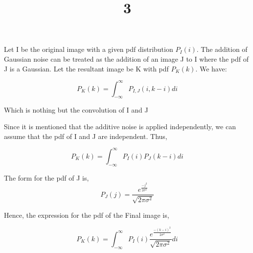\documentclass[a4paper]{article}
\title{3}
\date{}
\begin{document}
\maketitle




Let I be the original image with a given pdf distribution $P_I(i)$.
The addition of Gaussian noise can be treated as the addition of an image J to I where the pdf of J is a Gaussian.
Let the resultant image be K with pdf $P_K(k)$. We have:

\begin{equation}
    P_K(k) = \int_{-\infty}^{\infty} P_{I,J}(i,k-i)di
\end{equation}

Which is nothing but the convolution of I and J

Since it is mentioned that the additive noise is applied independently, we can assume that the pdf of I and J are independent. Thus,

\begin{equation}
    P_K(k) = \int_{-\infty}^{\infty} P_{I}(i)P_{J}(k-i)di   
\end{equation}

The form for the pdf of J is,
\begin{equation}
P_J(j) = \frac{e^{\frac{-j^2}{2\sigma^2}}}{\sqrt{2\pi\sigma^2}}  
\end{equation}

Hence, the expression for the pdf of the Final image is,

\begin{equation}
    P_K(k) = \int_{-\infty}^{\infty} P_{I}(i) \frac{e^{\frac{-(k-i)^2}{2\sigma^2}}}{\sqrt{2\pi\sigma^2}} di   
\end{equation}
\end{document}
